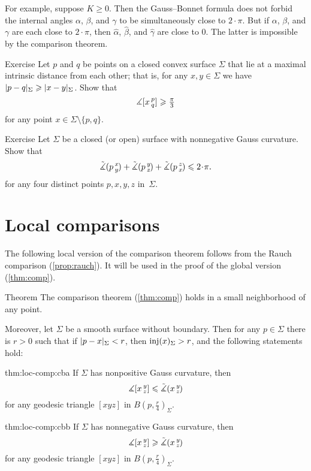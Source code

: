 For example, suppose $K\ge 0$.
Then the Gauss--Bonnet formula does not forbid the internal angles $\alpha$, $\beta$, and $\gamma$ to be simultaneously close to $2\cdot\pi$.
But if $\alpha$, $\beta$, and $\gamma$ are each close to $2\cdot\pi$, then $\hat\alpha$, $\hat\beta$, and $\hat\gamma$ are close to $0$.
The latter is impossible by the comparison theorem.

\begin{thm}{Exercise}\label{ex:diam-angle}
Let $p$ and $q$ be points on a closed convex surface $\Sigma$ that lie at a maximal intrinsic distance from each other;
that is, for any $x,y\in \Sigma$ we have $\dist{p}{q}\Sigma\z\ge\dist{x}{y}\Sigma$.
Show that 
\[\measuredangle[x\,{}^{p}_{q}]\geqslant \tfrac\pi3\]
for any point $x\in \Sigma\setminus\{p,q\}$.
\end{thm}

\begin{thm}{Exercise}\label{ex:sum=<2pi}
Let $\Sigma$ be a closed (or open) surface with nonnegative Gauss curvature.
Show that 
\[\modangle pxy+\modangle pyz+\modangle pzx\le2\cdot \pi.\]
for any four distinct points $p,x,y,z$ in~$\Sigma$.
\end{thm}

\section{Local comparisons}\label{sec:loc-comp}

The following local version of the comparison theorem follows from the Rauch comparison (\ref{prop:rauch}).
It will be used in the proof of the global version (\ref{thm:comp}).

\begin{thm}{Theorem}\label{thm:loc-comp}
The comparison theorem (\ref{thm:comp}) holds in a small neighborhood of any point.

Moreover, let $\Sigma$ be a smooth surface without boundary.
Then for any $p\in \Sigma$ there is $r>0$ such that if $\dist{p}{x}\Sigma<r$, then $\mathop{\rm inj}\nolimits(x)_\Sigma>r$, and the following statements hold:

\begin{subthm}{thm:loc-comp:cba}
If $\Sigma$ has nonpositive Gauss curvature, then 
\[\measuredangle[x\,{}^{y}_{z}]\leqslant\tilde\measuredangle(x\,{}^{y}_{z}\hspace{-0.2ex})\]
for any geodesic triangle $[xyz]$ in $B(p,\tfrac r4)_\Sigma$.
\end{subthm}

\begin{subthm}{thm:loc-comp:cbb}
If $\Sigma$ has nonnegative Gauss curvature, then 
\[\measuredangle[x\,{}^{y}_{z}]\geqslant\tilde\measuredangle(x\,{}^{y}_{z}\hspace{-0.2ex})\]
for any geodesic triangle $[xyz]$ in $B(p,\tfrac r4)_\Sigma$.
\end{subthm}

\end{thm}

